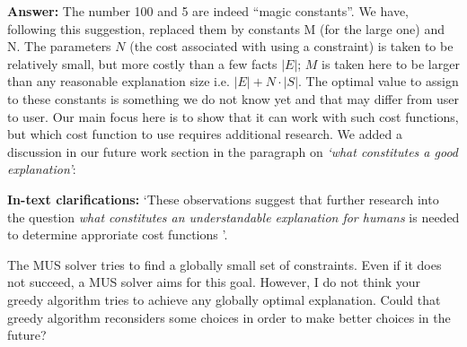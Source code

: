 \documentclass{article}
\newcommand\comment[1]{\marginpar{\tiny #1}}
\renewcommand\comment[1]{#1}
\newcommand{\tias}[1]{{\comment{\color{blue}\textsc{TG:}#1}}}
\newcommand{\answer}[1]{{\comment{\textbf{Answer:} #1}}}
\newcommand{\clarification}[1]{{\comment{\textbf{In-text clarifications:} #1}}}
\begin{document}
\answer{
	The number 100 and 5 are indeed ``magic constants''. We have, following this suggestion, replaced them by constants M (for the large one) and N. 
	The parameters $N$ (the cost associated with using a constraint) is taken to be relatively small, but more costly than a few facts $|E|$; $M$ is taken here to be larger than any reasonable explanation size  i.e. $|E| + N \cdot |S|$.
	The optimal value to assign to these constants is something we do not know yet and that may differ from user to user. Our main focus here is to show that it can work with such cost functions, but which cost function to use requires additional research. We added a discussion in our future work section in the paragraph on \emph{`what constitutes a good explanation'}:}
	

	\clarification{
		`These observations suggest that further research into the question \emph{what constitutes an understandable explanation for humans} is needed to determine approriate cost functions \cite{hoffman2018metrics,rosenfeld2021better}'.
} 


\begin{quoteit}
The MUS solver tries to find a globally small set of constraints. Even if it does not succeed, a MUS solver aims for this goal. However, I do not think your greedy algorithm tries to achieve any globally optimal explanation.
Could that greedy algorithm reconsiders some choices in order to make better choices in the future?
\end{quoteit}
\end{document}
